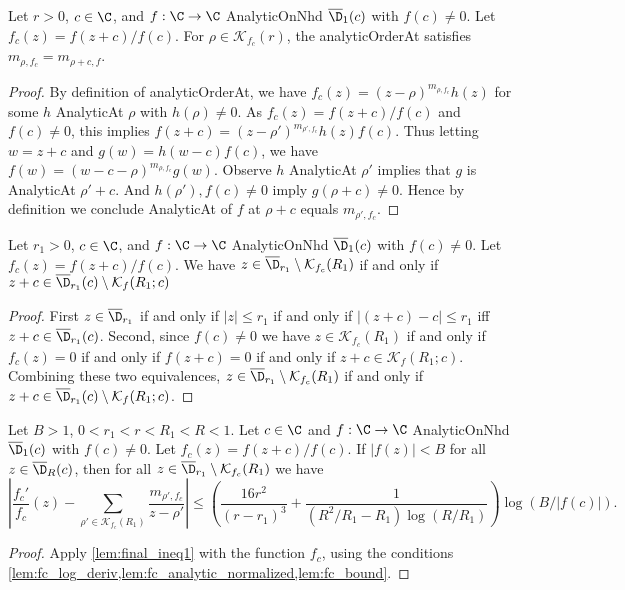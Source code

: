 \begin{lemma} \label{lem:fc_m_order}  \leanok
Let $r>0$, $c\in\C$, and $f:\C\to\C$ AnalyticOnNhd $\overline{\D}_1(c)$ with $f(c)\neq 0$. Let $f_c(z) = f(z+c)/f(c)$. For $\rho \in \mathcal{K}_{f_c}(r)$, the analyticOrderAt satisfies $m_{\rho,f_c} = m_{\rho+c,f}$.
\end{lemma}
\begin{proof}
\leanok
By definition of analyticOrderAt, we have $f_c(z) = (z-\rho)^{m_{\rho,f_c}} h(z)$ for some $h$ AnalyticAt $\rho$ with $h(\rho)\neq0$. As $f_c(z) = f(z+c)/f(c)$ and $f(c)\neq 0$, this implies
$f(z+c) = (z-\rho')^{m_{\rho',f_c}} h(z)f(c)$. Thus letting $w=z+c$ and $g(w) = h(w-c)f(c)$, we have $f(w) = (w-c-\rho)^{m_{\rho,f_c}} g(w)$. Observe $h$ AnalyticAt $\rho'$ implies that $g$ is AnalyticAt $\rho'+c$. And $h(\rho'),f(c)\neq0$ imply $g(\rho+c)\neq0$. Hence by definition we conclude AnalyticAt of $f$ at $\rho+c$ equals $m_{\rho',f_c}$.
\end{proof}


\begin{lemma}\label{lem:DminusK}  \leanok
Let $r_1>0$, $c\in\C$, and $f:\C\to\C$ AnalyticOnNhd $\overline{\D}_1(c)$ with $f(c)\neq 0$. Let $f_c(z) = f(z+c)/f(c)$. We have $z\in \overline{\D}_{r_1} \setminus\mathcal K_{f_c}(R_1)$ if and only if $z+c\in \overline{\D}_{r_1}(c) \setminus\mathcal K_{f}(R_1;c)$
\end{lemma}
\begin{proof}
\leanok
First $z\in \overline{\D}_{r_1}$ if and only if $|z| \le r_1$ if and only if $|(z+c)-c|\le r_1$ iff $z+c\in \overline{\D}_{r_1}(c)$.
Second, since $f(c)\neq0$ we have $z\in \mathcal K_{f_c}(R_1)$ if and only if $f_c(z)=0$ if and only if $f(z+c)=0$ if and only if $z+c\in \mathcal K_{f}(R_1;c)$.
Combining these two equivalences, $z\in \overline{\D}_{r_1} \setminus\mathcal K_{f_c}(R_1)$ if and only if $z+c\in \overline{\D}_{r_1}(c) \setminus\mathcal K_{f}(R_1;c)$.
\end{proof}


\begin{lemma}\label{lem:final_ineq2}  \leanok
Let $B>1$, $0<r_1<r<R_1<R<1$. Let $c\in\C$ and $f:\C\to\C$ AnalyticOnNhd $\overline{\D}_1(c)$ with $f(c)\neq 0$. Let $f_c(z) = f(z+c)/f(c)$. If $|f(z)| < B$ for all $z\in \overline{\D}_R(c)$, then for all $z\in \overline{\D}_{r_1} \setminus\mathcal K_{f_c}(R_1)$ we have
\[\left|\frac{f_c'}{f_c}(z) - \sum_{\rho'\in\mathcal K_{f_c}(R_1)}\frac{m_{\rho',f_c}}{z-\rho'}\right| \le \left(\frac{16 r^2}{(r-r_1)^3} + \frac{1}{(R^2/R_1 - R_1)\log(R/R_1)}\right)\log(B/|f(c)|).\]
\end{lemma}
\begin{proof}
\leanok
Apply \cref{lem:final_ineq1} with the function $f_c$, using the conditions \cref{lem:fc_log_deriv,lem:fc_analytic_normalized,lem:fc_bound}.
\end{proof}


